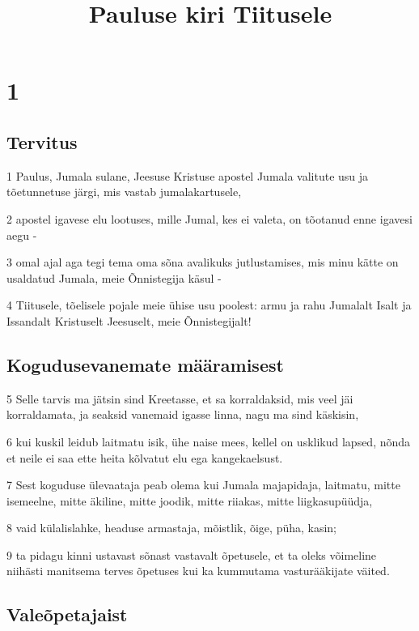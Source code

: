 

\title{Pauluse kiri Tiitusele}

\chapter{1}

\section*{Tervitus}

\par 1 Paulus, Jumala sulane, Jeesuse Kristuse apostel Jumala valitute usu ja tõetunnetuse järgi, mis vastab jumalakartusele,
\par 2 apostel igavese elu lootuses, mille Jumal, kes ei valeta, on tõotanud enne igavesi aegu -
\par 3 omal ajal aga tegi tema oma sõna avalikuks jutlustamises, mis minu kätte on usaldatud Jumala, meie Õnnistegija käsul -
\par 4 Tiitusele, tõelisele pojale meie ühise usu poolest: armu ja rahu Jumalalt Isalt ja Issandalt Kristuselt Jeesuselt, meie Õnnistegijalt!

\section*{Kogudusevanemate määramisest}

\par 5 Selle tarvis ma jätsin sind Kreetasse, et sa korraldaksid, mis veel jäi korraldamata, ja seaksid vanemaid igasse linna, nagu ma sind käskisin,
\par 6 kui kuskil leidub laitmatu isik, ühe naise mees, kellel on usklikud lapsed, nõnda et neile ei saa ette heita kõlvatut elu ega kangekaelsust.
\par 7 Sest koguduse ülevaataja peab olema kui Jumala majapidaja, laitmatu, mitte isemeelne, mitte äkiline, mitte joodik, mitte riiakas, mitte liigkasupüüdja,
\par 8 vaid külalislahke, headuse armastaja, mõistlik, õige, püha, kasin;
\par 9 ta pidagu kinni ustavast sõnast vastavalt õpetusele, et ta oleks võimeline niihästi manitsema terves õpetuses kui ka kummutama vasturääkijate väited.

\section*{Valeõpetajaist}

